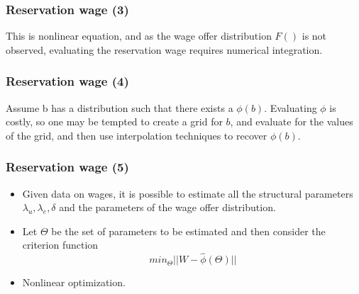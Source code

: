 \documentclass{beamer}
\newcommand{\lau}{\lambda_u}
\newcommand{\lae}{\lambda_e}
\newcommand{\1}{\mathbb{1}}
\begin{document}
\begin{frame}\frametitle{Reservation wage (3)}
This is nonlinear equation, and as the wage offer distribution $F()$ is not observed, evaluating the reservation wage requires numerical integration. 
\end{frame}

\begin{frame}\frametitle{Reservation wage (4)}
Assume b has a distribution such that there exists a $\phi(b)$. Evaluating $\phi$ is costly, so one may be tempted to create a grid for $b$, and evaluate for the values of the grid, and then use interpolation techniques to recover $\phi(b)$.
\end{frame}

\begin{frame}\frametitle{Reservation wage (5)}
\begin{itemize}
\item Given data on wages, it is possible to estimate all the structural parameters $\lau,\lae,\delta$ and the parameters of the wage offer distribution. 
\item Let $\Theta$ be the set of parameters to be estimated and then consider the criterion function
 \begin{equation}
  min_{\Theta} || W - \hat{\phi}(\Theta) ||
 \end{equation}
\item Nonlinear optimization. 
\end{itemize}
\end{frame}




\end{document}
